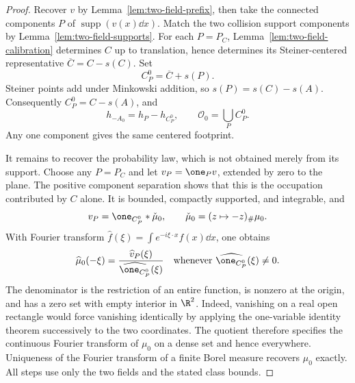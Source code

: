 \begin{proof}
Recover $v$ by Lemma~\ref{lem:two-field-prefix}, then take the
connected components $P$ of $\operatorname{supp}(v(x)\dd x)$.
Match the two collision
support components by Lemma~\ref{lem:two-field-supports}.
For each $P=P_C$, Lemma~\ref{lem:two-field-calibration} determines
$C$ up to translation, hence determines its Steiner-centered
representative $\overline C=C-s(C)$.
Set
\begin{equation}\label{eq:two-field-geometry-recovery}
                  C_P^0=\overline C+s(P).
\end{equation}
Steiner points add under Minkowski addition, so
$s(P)=s(C)-s(A)$.  Consequently $C_P^0=C-s(A)$, and
\[
 h_{-A_0}=h_P-h_{C_P^0},\qquad
                         \mathcal O_0=\bigcup_P C_P^0.
\]
Any one component gives the same centered footprint.

It remains to recover the probability law, which is not obtained merely
from its support.  Choose any $P=P_C$ and let $v_P=\one_Pv$,
extended by zero to the plane.  The positive component separation
shows that this is the occupation contributed by $C$ alone.
It is bounded, compactly supported, and integrable, and
\begin{equation}\label{eq:two-field-density-convolution}
                        v_P=\one_{C_P^0}*\check\mu_0,
 \qquad \check\mu_0=(z\mapsto-z)_\#\mu_0.
\end{equation}
With Fourier transform $\widehat f(\xi)=\int
e^{-i\xi\cdot x}f(x)\dd x$, one obtains
\begin{equation}\label{eq:two-field-density-quotient}
 \widehat\mu_0(-\xi)
             =\frac{\widehat v_P(\xi)}
                    {\widehat{\one_{C_P^0}}(\xi)}
 \quad\text{whenever }
                    \widehat{\one_{C_P^0}}(\xi)\ne0.
\end{equation}
The denominator is the restriction of an entire function, is
nonzero at the origin, and has a zero set with empty interior in
$\R^2$.  Indeed, vanishing on a real open rectangle would force
vanishing identically by applying the one-variable identity
theorem successively to the two coordinates.  The quotient
therefore specifies the continuous Fourier transform of $\mu_0$
on a dense set and hence everywhere.  Uniqueness of the Fourier
transform of a finite Borel measure recovers $\mu_0$ exactly.
All steps use only the two fields and the stated class bounds.
\end{proof}

